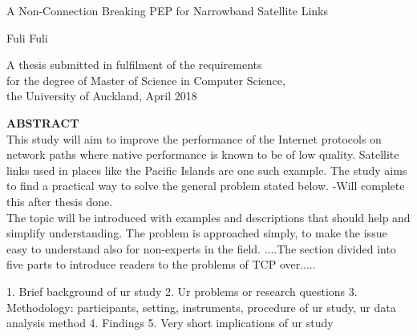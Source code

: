 \documentclass{uathesis}
\begin{document}


\thispagestyle{empty}
\begin{center}
\vspace*{5cm}
{\Huge\baselineskip=1.5cm
A Non-Connection Breaking PEP for Narrowband Satellite Links}\\
\mbox{}\par %
\vspace*{1cm}
{\huge Fuli Fuli}\par %
\vspace{8cm}

{\Large A thesis submitted in fulfilment of the requirements\\
for the degree of Master of Science in Computer Science, \\
the University of Auckland, April 2018}
\end{center}


\newpage

                                    
\noindent \textbf{ABSTRACT} \\
This study will aim to improve the performance of the Internet protocols on network paths where native performance is known to be of low quality. Satellite links used in places like the Pacific Islands are one such example. The study aims to find a practical way to solve the general problem stated below. -Will complete this after thesis done.\\

The topic will be introduced with examples and descriptions that
should help and simplify understanding. The problem is approached simply, to make the issue easy to understand also for non-experts in the field. ....The section divided into five parts to introduce readers to the problems of TCP over.....

1. Brief background of ur study
2. Ur problems or research questions
3. Methodology: participants, setting, instruments, procedure of ur study, ur data analysis method
4. Findings
5. Very short implications of ur study \\
\end{document}
